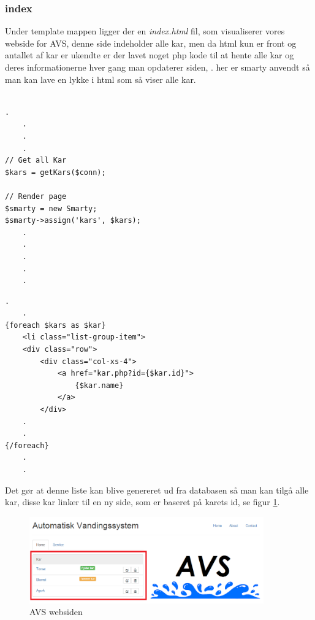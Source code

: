 \subsubsection{index}
Under template mappen ligger der en \textit{index.html} fil, som visualiserer vores webside for \gls{AVS}, denne side indeholder alle kar, men da html kun er front og antallet af kar er ukendte er der lavet noget php kode til at hente alle kar og deres informationerne hver gang man opdaterer siden, . her er smarty anvendt så man kan lave en lykke i html som så viser alle kar.\\\\
\begin{minipage}{.5\textwidth}
\begin{lstlisting}[caption=index.php]
	.
	.
	.
	.
// Get all Kar
$kars = getKars($conn);

// Render page
$smarty = new Smarty;
$smarty->assign('kars', $kars);
	.
	.
	.
	.
	.
\end{lstlisting}
\end{minipage}%
\begin{minipage}{.5\textwidth}
\begin{lstlisting}[caption=index.html]
	.
	.
{foreach $kars as $kar}
	<li class="list-group-item">
	<div class="row">
		<div class="col-xs-4">
			<a href="kar.php?id={$kar.id}">
				{$kar.name}
			</a>
		</div>
	.
	.																		
{/foreach}
	.
	.
\end{lstlisting}
\end{minipage}

Det gør at denne liste kan blive genereret ud fra databasen så man kan tilgå alle kar, disse kar linker til en ny side, som er baseret på karets id, se figur \ref{fig:index}. 
\begin{figure}[H]
    \centering
    \includegraphics[width=0.9\textwidth]{SoftwareArkitektur/GUI/Controller/photo/index.PNG}
    \caption{AVS websiden}
    \label{fig:index}
\end{figure}


